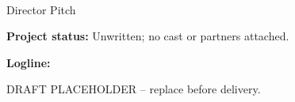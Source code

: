 \documentclass[11pt,letterpaper]{article}
\begin{document}
\begin{center}
{\Large\bfseries\sffamily \filmtitleupper}\\[6pt]
Director Pitch
\end{center}
\textbf{Project status:} Unwritten; no cast or partners attached.

\textbf{Logline:} \filmlogline

DRAFT PLACEHOLDER -- replace before delivery.
\end{document}
